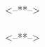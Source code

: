 \documentclass[14pt]{extarticle}
\begin{document}
\begin{center}
\Large
<--**-->
\end{center}
\vspace{10mm}



\paragraph{} <--**-->
\end{document}
